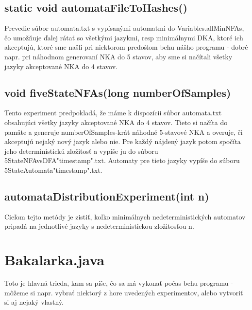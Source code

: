 \subsection*{static void automataFileToHashes()}
Prevedie súbor automata.txt s vypísanými automatmi do Variables.allMinNFAs, čo umožňuje ďalej rátať so všetkými jazykmi, resp minimálnymi DKA, ktoré ich akceptujú, ktoré sme našli pri niektorom predošlom behu nášho programu - dobré napr. pri náhodnom generovaní NKA do 5 stavov, aby sme si načítali všetky jazyky akceptované NKA do 4 stavov.

\subsection*{void fiveStateNFAs(long numberOfSamples)}
Tento experiment predpokladá, že máme k dispozícii súbor automata.txt obsahujúci všetky jazyky akceptované NKA do 4 stavov. Tieto si načíta do pamäte a generuje numberOfSamples-krát náhodné 5-stavové NKA a overuje, či akceptujú nejaký nový jazyk alebo nie. Pre každý nájdený jazyk potom spočíta jeho deterministickú zložitosť a vypíše ju do súboru 5StateNFAvsDFA"timestamp".txt. Automaty pre tieto jazyky vypíše do súboru 5StateAutomata"timestamp".txt. 

\subsection*{automataDistributionExperiment(int n)}
Cieľom tejto metódy je zistiť, koľko minimálnych nedeterministických automatov pripadá na jednotlivé jazyky s nedeterministickou zložitosťou n.

\section{Bakalarka.java}
Toto je hlavná trieda, kam sa píše, čo sa má vykonať počas behu programu - môžeme si napr. vybrať niektorý z hore uvedených experimentov, alebo vytvoriť si aj nejaký vlastný.
